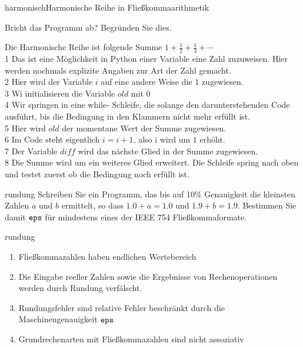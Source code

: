 \begin{Beispiel*}{harmonisch}{Harmonische Reihe in Fließkommaarithmetik}
  

  Bricht das Programm ab? Begründen Sie dies.
\end{Beispiel*}
\begin{remark}
  Die Harmonische Reihe ist folgende Summe $1+ \tfrac12 + \tfrac13 + \cdots$ \\
   1 Das ist eine Möglichkeit in Python einer Variable eine Zahl zuzuweisen. Hier werden
  nochmals explizite Angaben zur Art der Zahl gemacht.\\
   2 Hier wird der Variable $i$ auf eine andere Weise die $1$ zugewiesen.\\
   3 Wi initialisieren die Variable $old$ mit $0$ \\
   4 Wir springen in eine while- Schleife, die solange den darunterstehenden Code ausführt, bis
  die Bedingung in den Klammern nicht mehr erfüllt ist.\\
   5 Hier wird $old$ der momentane Wert der Summe zugewiesen.\\
   6 Im Code steht eigentlich $i=i+1$, also i wird um $1$ erhöht.\\
   7 Der Variable $diff$ wird das nächste Glied in der Summe zugewiesen.\\
   8 Die Summe wird um ein weiteres Glied erweitert. Die Schleife spring nach oben und
  testet zuerst ob die Bedingung noch erfüllt ist. 
\end{remark}

\begin{Aufgabe}{rundung}
  Schreiben Sie ein Programm, das bis auf 10\% Genauigkeit die
  kleinsten Zahlen $a$ und $b$ ermittelt, so dass $1.0+a=1.0$ und
  $1.9+b=1.9$. Bestimmen Sie damit $\texttt{eps}$ für mindestens eines der
  IEEE 754 Fließkommaformate.
\end{Aufgabe}

\begin{Fazit}{rundung}
  \begin{enumerate}
  \item Fließkommazahlen haben endlichen Wertebereich
  \item Die Eingabe reeller Zahlen sowie die Ergebnisse von
    Rechenoperationen werden durch Rundung verfälscht.
  \item Rundungsfehler sind relative Fehler beschränkt durch die
    Maschinengenauigkeit $\texttt{eps}$
  \item Grundrechenarten mit Fließkommazahlen sind nicht assoziativ
  \end{enumerate}
\end{Fazit}

